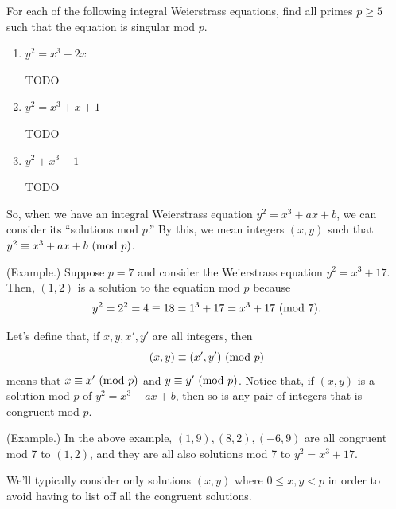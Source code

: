 \documentclass[letterpaper]{article}
\begin{document}
\begin{mdframed}
    For each of the following integral Weierstrass equations, find all primes $p \geq 5$ such that the equation is singular mod $p$. 
    \begin{enumerate}
        \item $y^2 = x^3 - 2x$    
        \begin{mdframed}
            TODO 
        \end{mdframed}
        \item $y^2 = x^3 + x + 1$
        \begin{mdframed}
            TODO 
        \end{mdframed}
        \item $y^2 + x^3 - 1$
        \begin{mdframed}
            TODO 
        \end{mdframed}
    \end{enumerate}
\end{mdframed}
So, when we have an integral Weierstrass equation $y^2 = x^3 + ax + b$, we can consider its ``solutions mod $p$.'' By this, we mean integers $(x, y)$ such that $y^2 \equiv x^3 + ax + b \ (\mathrm{mod}\ p)$. 

\begin{mdframed}
    (Example.) Suppose $p = 7$ and consider the Weierstrass equation $y^2 = x^3 + 17$. Then, $(1, 2)$ is a solution to the equation mod $p$ because 
    \[y^2 = 2^2 = 4 \equiv 18 = 1^3 + 17 = x^3 + 17 \ (\mathrm{mod}\ 7).\]
\end{mdframed}
Let's define that, if $x, y, x', y'$ are all integers, then 
\[(x, y) \equiv (x', y') \ (\mathrm{mod}\ p)\]
means that $x \equiv x' \ (\mathrm{mod}\ p)$ and $y \equiv y' \ (\mathrm{mod}\ p)$. Notice that, if $(x, y)$ is a solution mod $p$ of $y^2 = x^3 + ax + b$, then so is any pair of integers that is congruent mod $p$. 
\begin{mdframed}
    (Example.) In the above example, $(1, 9), (8, 2), (-6, 9)$ are all congruent mod 7 to $(1, 2)$, and they are all also solutions mod 7 to $y^2 = x^3 + 17$. 
\end{mdframed}    
We'll typically consider only solutions $(x, y)$ where $0 \leq x, y < p$ in order to avoid having to list off all the congruent solutions.
\end{document}
